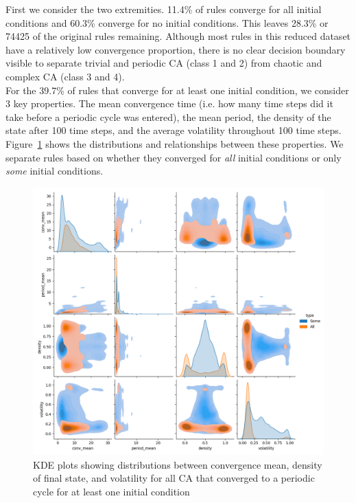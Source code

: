 First we consider the two extremities. 11.4\% of rules converge for all initial conditions and 60.3\% converge for no initial conditions. This leaves 28.3\% or 74425 of the original rules remaining. Although most rules in this reduced dataset have a relatively low convergence proportion, there is no clear decision boundary visible to separate trivial and periodic CA (class 1 and 2) from chaotic and complex CA (class 3 and 4).\\

For the 39.7\% of rules that converge for at least one initial condition, we consider 3 key properties. The mean convergence time (i.e. how many time steps did it take before a periodic cycle was entered), the mean period, the density of the state after 100 time steps, and the average volatility throughout 100 time steps. Figure~\ref{fig:tax-pairplot} shows the distributions and relationships between these properties. We separate rules based on whether they converged for \textit{all} initial conditions or only \textit{some} initial conditions.\\

\begin{figure}[!h]
\centering 
\includegraphics[width=\textwidth]{images/tax-pairplot.png}
\caption{KDE plots showing distributions between convergence mean, density of final state, and volatility for all CA that converged to a periodic cycle for at least one initial condition}
\label{fig:tax-pairplot}
\end{figure}

